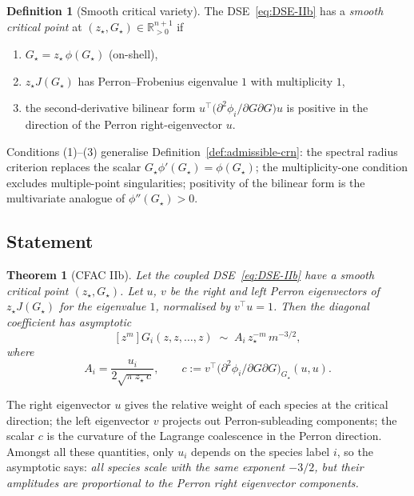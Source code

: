 \documentclass[11pt,a4paper]{article}
\newcommand{\R}{\mathbb{R}}
\theoremstyle{plain}
\newtheorem{theorem}{Theorem}
\theoremstyle{definition}
\newtheorem{definition}{Definition}
\begin{document}
\begin{definition}[Smooth critical variety]
\label{def:smooth-critical}
The DSE~\eqref{eq:DSE-IIb} has a \emph{smooth critical point} at
$(z_\star, G_\star) \in \R^{n+1}_{>0}$ if
\begin{enumerate}[label=(\arabic*), leftmargin=1.4em]
  \item $G_\star = z_\star\, \phi(G_\star)$ (on-shell),
  \item $z_\star J(G_\star)$ has Perron--Frobenius eigenvalue $1$ with
    multiplicity $1$,
  \item the second-derivative bilinear form
    $u^\top \bigl(\partial^2 \phi_i / \partial G \partial G\bigr) u$
    is positive in the direction of the Perron right-eigenvector $u$.
\end{enumerate}
\end{definition}

Conditions (1)--(3) generalise Definition~\ref{def:admissible-crn}:
the spectral radius criterion replaces the scalar $G_\star \phi'(G_\star)
= \phi(G_\star)$; the multiplicity-one condition excludes multiple-point
singularities; positivity of the bilinear form is the multivariate
analogue of $\phi''(G_\star) > 0$.

\subsection{Statement}

\begin{thmbox}
\begin{theorem}[CFAC IIb]
\label{thm:IIb}
Let the coupled DSE~\eqref{eq:DSE-IIb} have a smooth critical point
$(z_\star, G_\star)$.  Let $u$, $v$ be the right and left Perron
eigenvectors of $z_\star J(G_\star)$ for the eigenvalue $1$, normalised
by $v^\top u = 1$.  Then the diagonal coefficient has asymptotic
\begin{equation}
\label{eq:IIb-asymp}
  [z^m] G_i(z, z, \dots, z) \;\sim\; A_i \, z_\star^{-m}\, m^{-3/2},
\end{equation}
where
\begin{equation}
\label{eq:IIb-A}
  A_i = \frac{u_i}{2\sqrt{\pi\, z_\star\, c}}, \qquad
  c := v^\top \bigl(\partial^2 \phi_i / \partial G \partial G\bigr)_{G_\star}\!(u, u).
\end{equation}
\end{theorem}
\end{thmbox}

The right eigenvector $u$ gives the relative weight of each species
at the critical direction; the left eigenvector $v$ projects out
Perron-subleading components; the scalar $c$ is the curvature of the
Lagrange coalescence in the Perron direction.  Amongst all these
quantities, only $u_i$ depends on the species label $i$, so the
asymptotic says: \emph{all species scale with the same exponent
$-3/2$, but their amplitudes are proportional to the Perron right
eigenvector components.}
\end{document}
